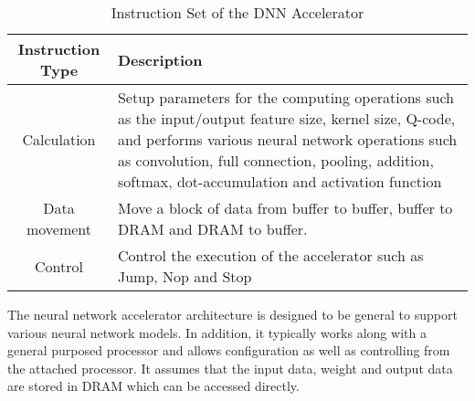 \begin{table}
    \centering
    \caption{Instruction Set of the DNN Accelerator}
    \label{tab:instrction-set}
    \begin{tabular}{cp{}}
        \toprule
        Instruction Type & Description \\
        \midrule
        Calculation & Setup parameters for the computing operations such as 
        the input/output feature size, kernel size, Q-code, and
        performs various neural network operations such as convolution, full 
        connection, pooling, addition, softmax, dot-accumulation and activation 
        function \\
        \midrule
        Data movement & Move a block of data from buffer to buffer, buffer to DRAM and DRAM to buffer.\\
        \midrule
        Control & Control the execution of the accelerator such as Jump, Nop and Stop\\
    \bottomrule
    \end{tabular}
    \vspace{-1em}
\end{table}

The neural network accelerator architecture is designed to be general to support 
various neural network models. In addition, it typically works along 
with a general purposed processor and allows configuration as well as 
controlling from the attached processor. It assumes that
the input data, weight and output data are stored in DRAM which can be 
accessed directly.
